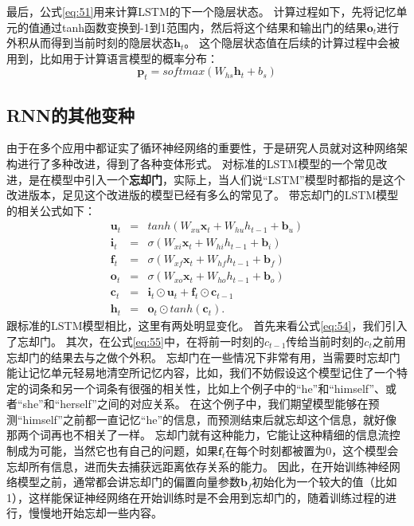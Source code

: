 \documentclass[10pt,a4paper]{ctexart}
\begin{document}
最后，公式\ref{eq:51}用来计算LSTM的下一个隐层状态。
计算过程如下，先将记忆单元的值通过tanh函数变换到-1到1范围内，然后将这个结果和输出门的结果$\textbf{o}_t$进行外积从而得到当前时刻的隐层状态$\textbf{h}_t$。
这个隐层状态值在后续的计算过程中会被用到，比如用于计算语言模型的概率分布：
\begin{equation}\label{eq:53}
 \textbf{p}_t = softmax(W_{hs}\textbf{h}_t + b_s)
\end{equation}

\subsection{RNN的其他变种}
由于在多个应用中都证实了循环神经网络的重要性，于是研究人员就对这种网络架构进行了多种改进，得到了各种变体形式。
对标准的LSTM模型的一个常见改进，是在模型中引入一个\textbf{忘却门}\cite{gers2000learning}，实际上，当人们说“LSTM”模型时都指的是这个改进版本，足见这个改进版的模型已经有多么的常见了。
带忘却门的LSTM模型的相关公式如下：
\begin{eqnarray}
 \textbf{u}_t & = & tanh(W_{xu}\textbf{x}_t + W_{hu}h_{t-1} + \textbf{b}_u) \nonumber \\
 \textbf{i}_t & = & \sigma (W_{xi}\textbf{x}_t + W_{hi}h_{t-1} + \textbf{b}_i) \nonumber \\
 \textbf{f}_t & = & \sigma (W_{xf}\textbf{x}_t + W_{hf}h_{t-1} + \textbf{b}_f) \label{eq:54}\\
 \textbf{o}_t & = & \sigma (W_{xo}\textbf{x}_t + W_{ho}h_{t-1} + \textbf{b}_o) \nonumber \\
 \textbf{c}_t & = & \textbf{i}_t \odot \textbf{u}_t + \textbf{f}_t \odot \textbf{c}_{t-1} \label{eq:55} \\
 \textbf{h}_t & = & \textbf{o}_t \odot tanh(\textbf{c}_t). \nonumber
\end{eqnarray}
跟标准的LSTM模型相比，这里有两处明显变化。
首先来看公式\ref{eq:54}，我们引入了忘却门。
其次，在公式\ref{eq:55}中，在将前一时刻的$c_{t-1}$传给当前时刻的$c_t$之前用忘却门的结果去与之做个外积。
忘却门在一些情况下非常有用，当需要时忘却门能让记忆单元轻易地清空所记忆内容，比如，我们不妨假设这个模型记住了一个特定的词条和另一个词条有很强的相关性，比如上个例子中的“he”和“himself”、或者“she”和“herself”之间的对应关系。
在这个例子中，我们期望模型能够在预测“himself”之前都一直记忆“he”的信息，而预测结束后就忘却这个信息，就好像那两个词再也不相关了一样。
忘却门就有这种能力，它能让这种精细的信息流控制成为可能，当然它也有自己的问题，如果$\textbf{f}_t$在每个时刻都被置为0，这个模型会忘却所有信息，进而失去捕获远距离依存关系的能力。
因此，在开始训练神经网络模型之前，通常都会讲忘却门的偏置向量参数$\textbf{b}_f$初始化为一个较大的值（比如1），这样能保证神经网络在开始训练时是不会用到忘却门的，随着训练过程的进行，慢慢地开始忘却一些内容。
\end{document}
